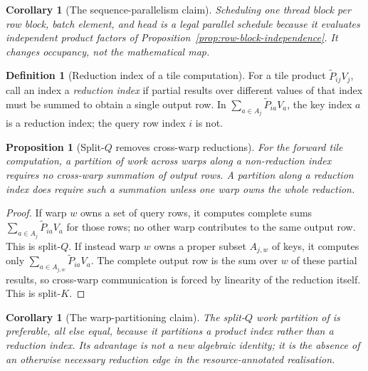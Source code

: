 \documentclass[11pt]{amsart}
\theoremstyle{plain}
\newtheorem{proposition}[theorem]{Proposition}
\newtheorem{corollary}[theorem]{Corollary}
\theoremstyle{definition}
\newtheorem{definition}[theorem]{Definition}
\begin{document}
\begin{corollary}[The sequence-parallelism claim]
\label{cor:sequence-parallelism-first-principles}
Scheduling one thread block per row block, batch element, and head is a legal
parallel schedule because it evaluates independent product factors of
Proposition~\ref{prop:row-block-independence}.  It changes occupancy, not the
mathematical map.
\end{corollary}

\begin{definition}[Reduction index of a tile computation]
\label{def:reduction-index}
For a tile product $\tilde{P}_{ij}V_j$, call an index a \emph{reduction
index} if partial results over different values of that index must be summed
to obtain a single output row.  In $\sum_{a \in A_j} \tilde{P}_{ia}V_{a}$,
the key index $a$ is a reduction index; the query row index $i$ is not.
\end{definition}

\begin{proposition}[Split-$Q$ removes cross-warp reductions]
\label{prop:split-q-first-principles}
For the forward tile computation, a partition of work across warps along a
non-reduction index requires no cross-warp summation of output rows.  A
partition along a reduction index does require such a summation unless one
warp owns the whole reduction.
\end{proposition}
\begin{proof}
If warp $w$ owns a set of query rows, it computes complete sums
$\sum_{a\in A_j}\tilde{P}_{ia}V_a$ for those rows; no other warp contributes
to the same output row.  This is split-$Q$.  If instead warp $w$ owns a
proper subset $A_{j,w}$ of keys, it computes only
$\sum_{a\in A_{j,w}}\tilde{P}_{ia}V_a$.  The complete output row is the sum
over $w$ of these partial results, so cross-warp communication is forced by
linearity of the reduction itself.  This is split-$K$.
\end{proof}

\begin{corollary}[The warp-partitioning claim]
\label{cor:warp-partition-first-principles}
The split-$Q$ work partition of \cite{Dao2023} is preferable, all else equal,
because it partitions a product index rather than a reduction index.  Its
advantage is not a new algebraic identity; it is the absence of an otherwise
necessary reduction edge in the resource-annotated realisation.
\end{corollary}
\end{document}
